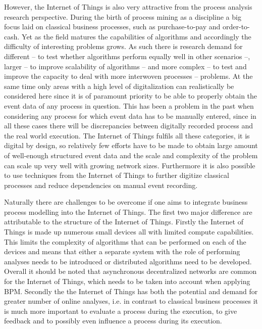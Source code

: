 \documentclass[runningheads]{template/llncs}
\begin{document}
However, the Internet of Things is also very attractive from the process analysis research perspective.
During the birth of process mining as a discipline a big focus laid on classical business processes, such as purchase-to-pay and order-to-cash.
Yet as the field matures the capabilities of algorithms and accordingly the difficulty of interesting problems grows.
As such there is research demand \cite{JKM*20} for different -- to test whether algorithms perform equally well in other scenarios --, larger -- to improve scalability of algorithms -- and more complex -- to test and improve the capacity to deal with more interwoven processes -- problems.
At the same time only areas with a high level of digitalization can realistically be considered here since it is of paramount priority to be able to properly obtain the event data of any process in question.
This has been a problem in the past when considering any process for which event data has to be manually entered, since in all these cases there will be discrepancies between digitally recorded process and the real world execution.
The Internet of Things fulfils all these categories, it is digital by design, so relatively few efforts have to be made to obtain large amount of well-enough structured event data and the scale and complexity of the problem can scale up very well with growing network sizes. 
Furthermore it is also possible to use techniques from the Internet of Things to further digitize classical processes and reduce dependencies on manual event recording.

Naturally there are challenges to be overcome if one aims to integrate business process modelling into the Internet of Things.
The first two major difference are attributable to the structure of the Internet of Things.
Firstly the Internet of Things is made up numerous small devices all with limited compute capabilities.
This limits the complexity of algorithms that can be performed on each of the devices and means that either a separate system with the role of performing analyses needs to be introduced or distributed algorithms need to be developed.
Overall it should be noted that asynchronous decentralized networks are common for the Internet of Things, which needs to be taken into account when applying BPM.
Secondly the the Internet of Things has both the potential and demand for greater number of online analyses, i.e. in contrast to classical business processes it is much more important to evaluate a process during the execution, to give feedback and to possibly even influence a process during its execution.
\end{document}
